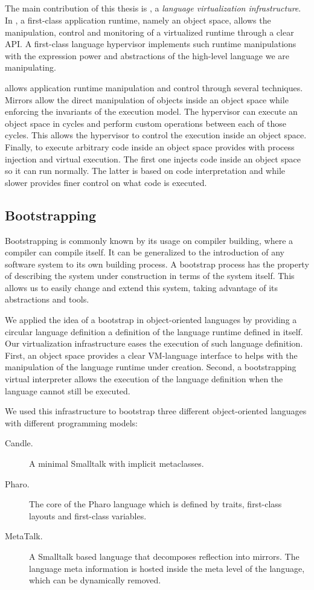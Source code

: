 \subsection{\Vtt}
The main contribution of this thesis is \Vtt, a \emph{language virtualization infrastructure}. In \Vtt, a first-class application runtime, namely an object space, allows the manipulation, control and monitoring of a virtualized runtime through a clear API. A first-class language hypervisor implements such runtime manipulations with the expression power and abstractions of the high-level language we are manipulating.

\Vtt allows application runtime manipulation and control through several techniques. Mirrors allow the direct manipulation of objects inside an object space while enforcing the invariants of the \VM execution model. The hypervisor can execute an object space in cycles and perform custom operations between each of those cycles. This allows the hypervisor to control the execution inside an object space. Finally, to execute arbitrary code inside an object space \Vtt provides with process injection and virtual execution. The first one injects code inside an object space so it can run normally. The latter is based on code interpretation and while slower provides finer control on what code is executed. 

\subsection{Bootstrapping}
Bootstrapping is commonly known by its usage on compiler building, where a compiler can compile itself.
It can be generalized to the introduction of any software system to its own building process.
A bootstrap process has the property of describing the system under construction in terms of the system itself. This allows us to easily change and extend this system, taking advantage of its abstractions and tools.

We applied the idea of a bootstrap in object-oriented languages by providing a circular language definition \ie a definition of the language runtime defined in itself.
Our virtualization infrastructure eases the execution of such language definition. First, an object space provides a clear VM-language interface to helps with the manipulation of the language runtime under creation. Second, a bootstrapping virtual interpreter allows the execution of the language definition when the language cannot still be executed.

We used this infrastructure to bootstrap three different object-oriented languages with different programming models: 
\begin{description}
\item[Candle.] A minimal Smalltalk with implicit metaclasses.
\item[Pharo.] The core of the Pharo language which is defined by traits, first-class layouts and first-class variables.
\item[MetaTalk.] A Smalltalk based language that decomposes reflection into mirrors. The language meta information is hosted inside the meta level of the language, which can be dynamically removed.
\end{description}

